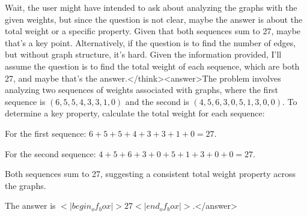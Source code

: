 Wait, the user might have intended to ask about analyzing the graphs with the given weights, but since the question is not clear, maybe the answer is about the total weight or a specific property. Given that both sequences sum to 27, maybe that's a key point. Alternatively, if the question is to find the number of edges, but without graph structure, it's hard. Given the information provided, I'll assume the question is to find the total weight of each sequence, which are both 27, and maybe that's the answer.</think><answer>The problem involves analyzing two sequences of weights associated with graphs, where the first sequence is \((6, 5, 5, 4, 3, 3, 1, 0)\) and the second is \((4, 5, 6, 3, 0, 5, 1, 3, 0, 0)\). To determine a key property, calculate the total weight for each sequence:  

For the first sequence:  
\(6 + 5 + 5 + 4 + 3 + 3 + 1 + 0 = 27\).  

For the second sequence:  
\(4 + 5 + 6 + 3 + 0 + 5 + 1 + 3 + 0 + 0 = 27\).  

Both sequences sum to 27, suggesting a consistent total weight property across the graphs.  

The answer is \(<|begin_of_box|>27<|end_of_box|>\).</answer>